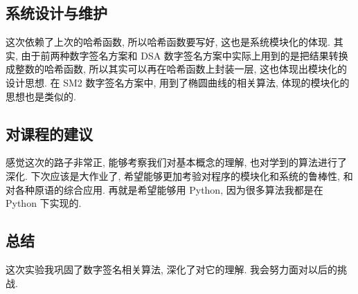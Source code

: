 \documentclass[12pt,a4paper]{article}
\begin{document}
\subsection*{系统设计与维护}

这次依赖了上次的哈希函数, 所以哈希函数要写好, 这也是系统模块化的体现. 其实, 由于前两种数字签名方案和 DSA 数字签名方案中实际上用到的是把结果转换成整数的哈希函数, 所以其实可以再在哈希函数上封装一层, 这也体现出模块化的设计思想. 在 SM2 数字签名方案中, 用到了椭圆曲线的相关算法, 体现的模块化的思想也是类似的. 

\subsection*{对课程的建议}

感觉这次的路子非常正, 能够考察我们对基本概念的理解, 也对学到的算法进行了深化. 下次应该是大作业了, 希望能够更加考验对程序的模块化和系统的鲁棒性, 和对各种原语的综合应用. 再就是希望能够用 Python, 因为很多算法我都是在 Python 下实现的. 

\subsection*{总结}

这次实验我巩固了数字签名相关算法, 深化了对它的理解. 我会努力面对以后的挑战. 
\end{document}
